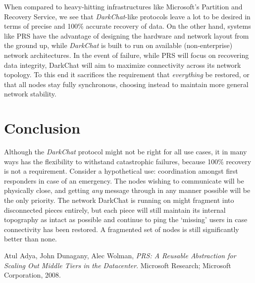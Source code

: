 \documentclass[11pt]{article}
\begin{document}
When compared to heavy-hitting infrastructures like Microsoft's Partition and Recovery Service\cite{prs}, we see that \emph{DarkChat}-like protocols leave a lot to be desired in terms of precise and 100\% accurate recovery of data. On the other hand, systems like PRS have the advantage of designing the hardware and network layout from the ground up, while \emph{DarkChat} is built to run on available (non-enterprise) network architectures. In the event of failure, while PRS will focus on recovering data integrity, DarkChat will aim to maximize connectivity across its network topology. To this end it sacrifices the requirement that \emph{everything} be restored, or that all nodes stay fully synchronous, choosing instead to maintain more general network stability.

\section{Conclusion}

Although the \emph{DarkChat} protocol might not be right for all use cases, it in many ways has the flexibility to withstand catastrophic failures, because 100\% recovery is not a requirement. Consider a hypothetical use: coordination amongst first responders in case of an emergency. The nodes wishing to communicate will be physically close, and getting \emph{any} message through in any manner possible will be the only priority. The network DarkChat is running on might fragment into disconnected pieces entirely, but each piece will still maintain its internal topography as intact as possible and continue to ping the `missing' users in case connectivity has been restored. A fragmented set of nodes is still significantly better than none.
   
\begin{thebibliography}{1}

    Atul Adya, John Dunagany, Alec Wolman,
    \emph{PRS: A Reusable Abstraction for Scaling Out Middle Tiers in the Datacenter}.
    Microsoft Research; Microsoft Corporation,
    2008.
\end{thebibliography}
\end{document}
